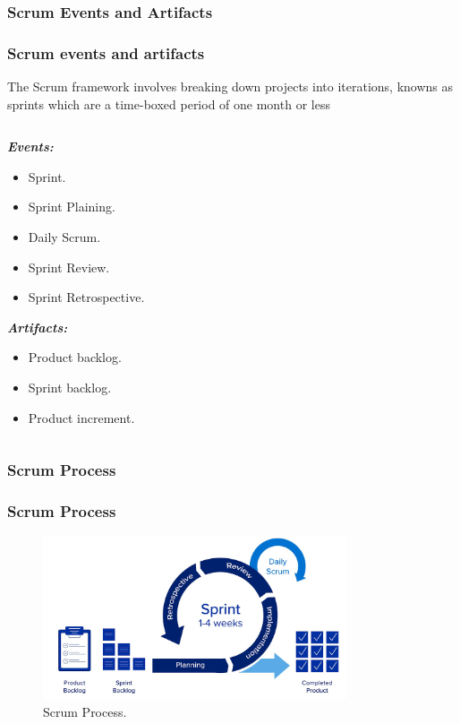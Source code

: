 \documentclass[
	11pt, %
]{beamer}
\begin{document}
\subsubsection{Scrum Events and Artifacts}
\begin{frame}
	\frametitle{Scrum events and artifacts}
	The Scrum framework involves breaking down 
	projects into iterations, knowns as sprints 
	which are a time-boxed period of one month 
	or less\\
	\begin{columns}[c] %
		\begin{column}{\textwidth} %
			\textbf{\it{Events:}} 
			\begin{itemize} %
				\item Sprint.
				\item Sprint Plaining.
				\item Daily Scrum.
				\item Sprint Review.
				\item Sprint Retrospective.
			\end{itemize}
			\textbf{\it{Artifacts:}} 
			\begin{itemize} %
				\item Product backlog.
				\item Sprint backlog.
				\item Product increment.
			\end{itemize}
		\end{column}
	\end{columns}
\end{frame}

\subsubsection{Scrum Process}

\begin{frame}
	\frametitle{Scrum Process}
	\begin{figure}
		\centering
		\includegraphics[width=0.8\textwidth]{fonc_Scrum.jpg}
		\caption{Scrum Process.}
	\end{figure}

\end{frame}
\end{document}
